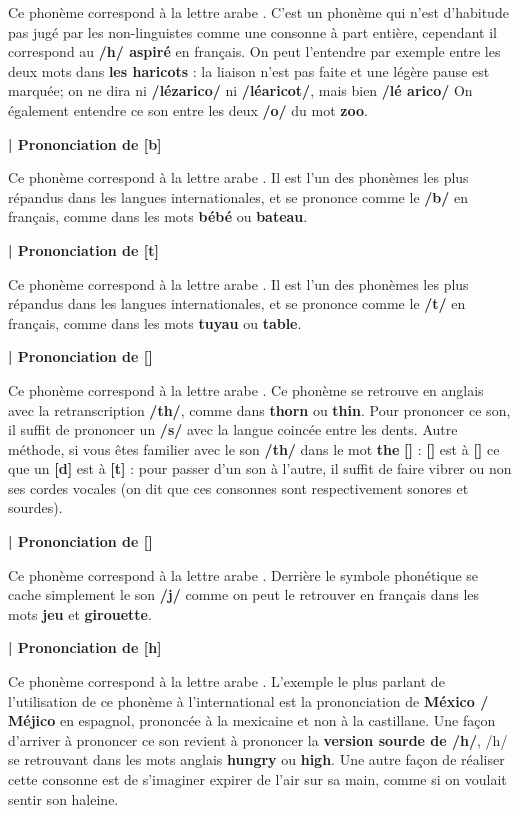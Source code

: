 Ce phonème correspond à la lettre arabe . C'est un phonème qui n'est d'habitude pas jugé par les non-linguistes comme une consonne à part entière, cependant il correspond au \textbf{/h/ aspiré} en français. On peut l'entendre par exemple entre les deux mots dans \textbf{les haricots} : la liaison n'est pas faite et une légère pause est marquée; on ne dira ni \textbf{/lézarico/} ni \textbf{/léaricot/}, mais bien \textbf{/lé arico/} On également entendre ce son entre les deux \textbf{/o/} du mot \textbf{zoo}.


\textbf{| Prononciation de  [b]}

Ce phonème correspond à la lettre arabe . Il est l'un des phonèmes les plus répandus dans les langues internationales, et se prononce comme le \textbf{/b/} en français, comme dans les mots \textbf{bébé} ou \textbf{bateau}.



\textbf{| Prononciation de  [t]}

Ce phonème correspond à la lettre arabe . Il est l'un des phonèmes les plus répandus dans les langues internationales, et se prononce comme le \textbf{/t/} en français, comme dans les mots \textbf{tuyau} ou \textbf{table}.



\textbf{| Prononciation de  [\texttheta]}

Ce phonème correspond à la lettre arabe . Ce phonème se retrouve en anglais avec la retranscription \textbf{/th/}, comme dans \textbf{thorn} ou \textbf{thin}. Pour prononcer ce son, il suffit de prononcer un \textbf{/s/} avec la langue coincée entre les dents. Autre méthode, si vous êtes familier avec le son \textbf{/th/} dans le mot \textbf{the} \textbf{[\dh]} : \textbf{[\dh]} est à \textbf{[\texttheta]} ce que un \textbf{[d]} est à \textbf{[t]} : pour passer d'un son à l'autre, il suffit de faire vibrer ou non ses cordes vocales (on dit que ces consonnes sont respectivement sonores et sourdes).

\textbf{| Prononciation de  [\textyogh]}

Ce phonème correspond à la lettre arabe . Derrière le symbole phonétique se cache simplement le son \textbf{/j/} comme on peut le retrouver en français dans les mots \textbf{jeu} et \textbf{girouette}.


\textbf{| Prononciation de  [h]}

Ce phonème correspond à la lettre arabe . L'exemple le plus parlant de l'utilisation de ce phonème à l'international est la prononciation de \textbf{México / Méjico} en espagnol, prononcée à la mexicaine et non à la castillane. Une façon d'arriver à prononcer ce son revient à prononcer la \textbf{version sourde de /h/}, /h/ se retrouvant dans les mots anglais \textbf{hungry} ou \textbf{high}. Une autre façon de réaliser cette consonne est de s'imaginer expirer de l'air sur sa main, comme si on voulait sentir son haleine.

